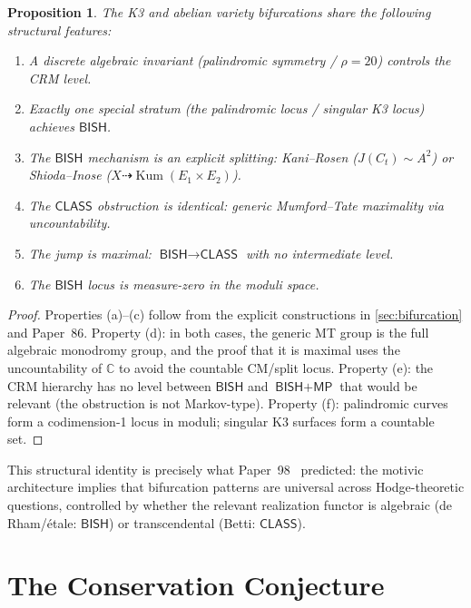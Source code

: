 \documentclass[11pt,a4paper]{article}
\theoremstyle{plain}
\newtheorem{proposition}[theorem]{Proposition}
\theoremstyle{definition}
\newcommand{\BISH}{\textsf{BISH}}
\newcommand{\MP}{\textsf{MP}}
\newcommand{\CLASS}{\textsf{CLASS}}
\newcommand{\C}{\mathbb{C}}
\DeclareMathOperator{\Kum}{Kum}
\begin{document}
\begin{proposition}\label{prop:parallel}
The K3 and abelian variety bifurcations share the following structural features:
\begin{enumerate}[label=(\alph*)]
  \item A discrete algebraic invariant (palindromic symmetry / $\rho = 20$) controls the CRM level.
  \item Exactly one special stratum (the palindromic locus / singular K3 locus) achieves $\BISH$.
  \item The $\BISH$ mechanism is an explicit splitting: Kani--Rosen ($J(C_t) \sim A^2$) or Shioda--Inose ($X \dashrightarrow \Kum(E_1 \times E_2)$).
  \item The $\CLASS$ obstruction is identical: generic Mumford--Tate maximality via uncountability.
  \item The jump is maximal: $\BISH \to \CLASS$ with no intermediate level.
  \item The $\BISH$ locus is measure-zero in the moduli space.
\end{enumerate}
\end{proposition}

\begin{proof}
Properties (a)--(c) follow from the explicit constructions in \cref{sec:bifurcation} and Paper~86. Property (d): in both cases, the generic MT group is the full algebraic monodromy group, and the proof that it is maximal uses the uncountability of $\C$ to avoid the countable CM/split locus. Property (e): the CRM hierarchy has no level between $\BISH$ and $\BISH{+}\MP$ that would be relevant (the obstruction is not Markov-type). Property (f): palindromic curves form a codimension-1 locus in moduli; singular K3 surfaces form a countable set.
\end{proof}

This structural identity is precisely what Paper~98~\cite{lee-p98} predicted: the motivic architecture implies that bifurcation patterns are universal across Hodge-theoretic questions, controlled by whether the relevant realization functor is algebraic (de Rham/\'etale: $\BISH$) or transcendental (Betti: $\CLASS$).


\section{The Conservation Conjecture}\label{sec:conservation}
\end{document}
